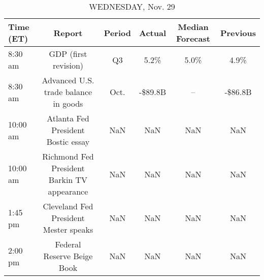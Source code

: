 \documentclass{article}%
\begin{document}
\begin{table}[htbp]%
\caption{WEDNESDAY, Nov. 29}%
\centering%
\begin{adjustbox}{width=1\textwidth}%
\begin{tabular}{lccccc}
\toprule
Time (ET) &                                      Report & Period &  Actual & Median Forecast & Previous \\
\midrule
  8:30 am &                        GDP (first revision) &     Q3 &    5.2\% &            5.0\% &     4.9\% \\
  8:30 am &        Advanced U.S. trade balance in goods &   Oct. & -\$89.8B &              -- &  -\$86.8B \\
 10:00 am &          Atlanta Fed President Bostic essay &    NaN &     NaN &             NaN &      NaN \\
 10:00 am & Richmond Fed President Barkin TV appearance &    NaN &     NaN &             NaN &      NaN \\
  1:45 pm &       Cleveland Fed President Mester speaks &    NaN &     NaN &             NaN &      NaN \\
  2:00 pm &                  Federal Reserve Beige Book &    NaN &     NaN &             NaN &      NaN \\
\bottomrule
\end{tabular}
%
\end{adjustbox}%
\end{table}

%
\end{document}
